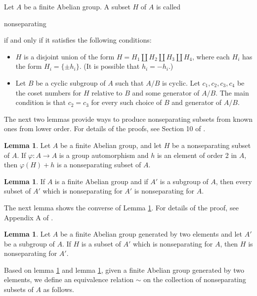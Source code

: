 \documentclass[article,dvisp]{amsart}
\theoremstyle{definition}
\newtheorem{lem}[thm]{Lemma}
\theoremstyle{remark}
\numberwithin{equation}{section}
\theoremstyle{lemma}
\begin{document}
Let $A$ be a finite Abelian group. A subset $H$ of $A$ is called \begin{em}nonseparating\end{em} if and only if it satisfies the following conditions:

\begin{itemize}
\item $H$ is a disjoint union of the form $H=H_{1}\coprod H_{2}\coprod H_{3}\coprod H_{4}$, where each $H_{i}$ has the form $H_{i}=\{\pm h_{i}\}$. (It is possible that $h_{i}=-h_{i}$.)                          
\item Let $B$ be a cyclic subgroup of $A$ such that $A/B$ is cyclic. Let  $c_{1},c_{2},c_{3},c_{4}$ be the coset numbers for $H$ relative to $B$ and some generator of $A/B$. The main condition is that $c_{2}=c_{3}$ for every such choice of $B$ and generator of $A/B$.
\end{itemize}

The next two lemmas provide ways to produce nonseparating subsets from known ones from lower order. For details of the proofs, see Section 10 of \cite{CFPP}.

\begin{lem}\label{lem:55} Let $A$ be a finite Abelian group, and let $H$ be a nonseparating subset of $A$. If $\varphi:A\to A$ is a group automorphism and $h$ is an element of order 2 in $A$,  then $\varphi(H)+h$ is a nonseparating subset of $A$.\end{lem} 

\begin{lem}\label{lem:56} If $A$ is a finite Abelian group and if $A'$ is a subgroup of $A$, then every subset of $A'$ which is nonseparating for $A'$ is nonseparating for $A$. \end{lem}

The next lemma shows the converse of Lemma \ref{lem:56}. For details of the proof, see Appendix A of \cite{S}.

\begin{lem}\label{lem:a05} Let $A$ be a finite Abelian group generated by two elements and let $A'$ be a subgroup of $A$. If $H$ is a subset of $A'$ which is nonseparating for $A$, then $H$ is nonseparating for $A'$.\end{lem}

Based on lemma \ref{lem:55} and lemma \ref{lem:56}, given a finite Abelian group generated by two elements, we define an equivalence relation $\sim$ on the collection of nonseparating subsets of $A$ as follows.
\end{document}
